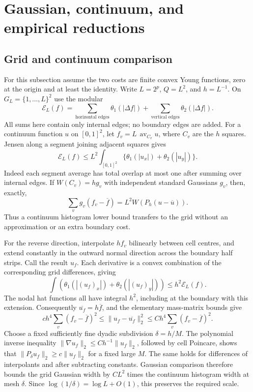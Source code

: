\documentclass[11pt]{article}
\numberwithin{equation}{section}
\begin{document}


\section{Gaussian, continuum, and empirical reductions}
\subsection{Grid and continuum comparison}
\label{subsec:grid-continuum-core}

For this subsection assume the two costs are finite convex Young functions, zero at the origin and at least the identity. Write $L=2^p$, $Q=L^2$, and $h=L^{-1}$. On $G_L=\{1,\ldots,L\}^2$
use the modular
\[
 \mathcal E_L(f)=\sum_{\text{horizontal edges}}\theta_1(|\Delta f|)
                    +\sum_{\text{vertical edges}}\theta_2(|\Delta f|).
\]
All sums here contain only internal edges; no boundary edges are added.
For a continuum function $u$ on $[0,1]^2$, let
$f_v=L\,\operatorname{av}_{C_v}u$, where $C_v$ are the $h$ squares.
Jensen along a segment joining adjacent squares gives
\begin{equation}\label{eq:averaging-energy-core}
 \mathcal E_L(f)\le L^2\int_{[0,1]^2}
               \{\theta_1(|u_x|)+\theta_2(|u_y|)\}.
\end{equation}
Indeed each segment average has total overlap at most one after summing
over internal edges. If $W(C_v)=h g_v$ with independent standard
Gaussians $g_v$, then, exactly,
\begin{equation}\label{eq:averaging-pairing-core}
 \sum_v g_v(f_v-\overline f)
       =L^2W(P_h(u-\overline u)).
\end{equation}
Thus a continuum histogram lower bound transfers to the grid without
an approximation or an extra boundary cost.

For the reverse direction, interpolate $h f_v$ bilinearly between cell
centres, and extend constantly in the outward normal direction across
the boundary half strips. Call the result $u_f$. Each derivative is a
convex combination of the corresponding grid differences, giving
\[
 \int(\theta_1(|(u_f)_x|)+\theta_2(|(u_f)_y|))\le h^2\mathcal E_L(f).
\]
The nodal hat functions all have integral $h^2$, including at the
boundary with this extension. Consequently
$\overline{u_f}=h\overline f$, and the elementary mass-matrix bounds give
\[
 c h^4\sum_v(f_v-\overline f)^2
 \le\|u_f-\overline{u_f}\|_2^2
 \le C h^4\sum_v(f_v-\overline f)^2.
\]
Choose a fixed sufficiently fine dyadic subdivision $\delta=h/M$.
The polynomial inverse inequality
$\|\nabla u_f\|_2\le C h^{-1}\|u_f\|_2$, followed by cell Poincare,
shows that $\|P_\delta u_f\|_2\ge c\|u_f\|_2$ for a fixed large $M$.
The same holds for differences of interpolants and after subtracting
constants. Gaussian comparison therefore bounds the grid Gaussian width
by $CL^2$ times the continuum histogram width at mesh $\delta$.
Since $\log(1/\delta)=\log L+O(1)$, this preserves the required scale.
\end{document}
